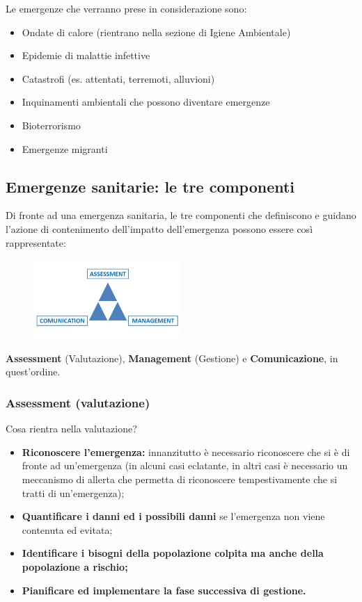 Le emergenze che verranno prese in considerazione sono:

\begin{itemize}
\item
  Ondate di calore (rientrano nella sezione di Igiene Ambientale)
\item
  Epidemie di malattie infettive
\item
  Catastrofi (es. attentati, terremoti, alluvioni)
\item
  Inquinamenti ambientali che possono diventare emergenze
\item
  Bioterrorismo
\item
  Emergenze migranti
\end{itemize}

\subsection{Emergenze sanitarie: le tre componenti}

Di fronte ad una emergenza sanitaria, le tre componenti che definiscono
e guidano l'azione di contenimento dell'impatto dell'emergenza possono
essere così rappresentate:

\begin{figure}[!ht]
\centering
	\includegraphics[width=0.5\textwidth]{26/image2.jpeg}
	\end{figure}

\textbf{Assessment} (Valutazione), \textbf{Management} (Gestione) e
\textbf{Comunicazione}, in quest'ordine.

\subsubsection{Assessment (valutazione)}

Cosa rientra nella valutazione?

\begin{itemize}
\item
  \textbf{Riconoscere l'emergenza:} innanzitutto è necessario
  riconoscere che si è di fronte ad un'emergenza (in alcuni casi
  eclatante, in altri casi è necessario un meccanismo di allerta che
  permetta di riconoscere tempestivamente che si tratti di
  un'emergenza);
\item
  \textbf{Quantificare i danni ed i possibili danni} se l'emergenza non
  viene contenuta ed evitata;
\item
  \textbf{Identificare i bisogni della popolazione colpita} \textbf{ma
  anche della popolazione a rischio;}
\item
  \textbf{Pianificare ed implementare la fase successiva di gestione.}
\end{itemize}

